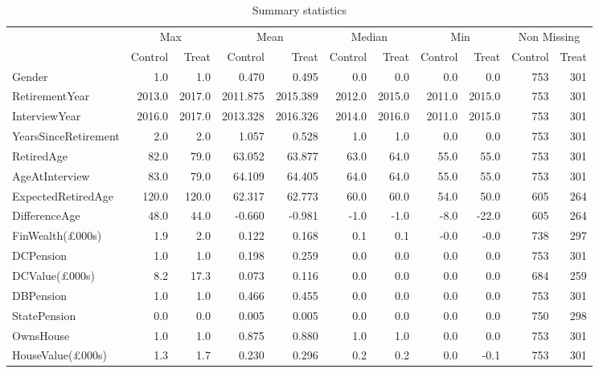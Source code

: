 \begin{table}

\caption{Summary statistics \label{tab:sum_stats} }
\centering
\fontsize{10}{12}\selectfont
\begin{tabular}[t]{lrrrrrrrrrr}
\toprule
\multicolumn{1}{c}{ } & \multicolumn{2}{c}{Max} & \multicolumn{2}{c}{Mean} & \multicolumn{2}{c}{Median} & \multicolumn{2}{c}{Min} & \multicolumn{2}{c}{Non Missing} \\
\cmidrule(l{3pt}r{3pt}){2-3} \cmidrule(l{3pt}r{3pt}){4-5} \cmidrule(l{3pt}r{3pt}){6-7} \cmidrule(l{3pt}r{3pt}){8-9} \cmidrule(l{3pt}r{3pt}){10-11}
 & Control & Treat & Control & Treat & Control & Treat & Control & Treat & Control & Treat\\
\midrule
Gender & 1.0 & 1.0 & 0.470 & 0.495 & 0.0 & 0.0 & 0.0 & 0.0 & 753 & 301\\
RetirementYear & 2013.0 & 2017.0 & 2011.875 & 2015.389 & 2012.0 & 2015.0 & 2011.0 & 2015.0 & 753 & 301\\
InterviewYear & 2016.0 & 2017.0 & 2013.328 & 2016.326 & 2014.0 & 2016.0 & 2011.0 & 2015.0 & 753 & 301\\
YearsSinceRetirement & 2.0 & 2.0 & 1.057 & 0.528 & 1.0 & 1.0 & 0.0 & 0.0 & 753 & 301\\
RetiredAge & 82.0 & 79.0 & 63.052 & 63.877 & 63.0 & 64.0 & 55.0 & 55.0 & 753 & 301\\
\addlinespace
AgeAtInterview & 83.0 & 79.0 & 64.109 & 64.405 & 64.0 & 64.0 & 55.0 & 55.0 & 753 & 301\\
ExpectedRetiredAge & 120.0 & 120.0 & 62.317 & 62.773 & 60.0 & 60.0 & 54.0 & 50.0 & 605 & 264\\
DifferenceAge & 48.0 & 44.0 & -0.660 & -0.981 & -1.0 & -1.0 & -8.0 & -22.0 & 605 & 264\\
FinWealth(£000s) & 1.9 & 2.0 & 0.122 & 0.168 & 0.1 & 0.1 & -0.0 & -0.0 & 738 & 297\\
DCPension & 1.0 & 1.0 & 0.198 & 0.259 & 0.0 & 0.0 & 0.0 & 0.0 & 753 & 301\\
\addlinespace
DCValue(£000s) & 8.2 & 17.3 & 0.073 & 0.116 & 0.0 & 0.0 & 0.0 & 0.0 & 684 & 259\\
DBPension & 1.0 & 1.0 & 0.466 & 0.455 & 0.0 & 0.0 & 0.0 & 0.0 & 753 & 301\\
StatePension & 0.0 & 0.0 & 0.005 & 0.005 & 0.0 & 0.0 & 0.0 & 0.0 & 750 & 298\\
OwnsHouse & 1.0 & 1.0 & 0.875 & 0.880 & 1.0 & 1.0 & 0.0 & 0.0 & 753 & 301\\
HouseValue(£000s) & 1.3 & 1.7 & 0.230 & 0.296 & 0.2 & 0.2 & 0.0 & -0.1 & 753 & 301\\

\end{tabular}
\end{table}
